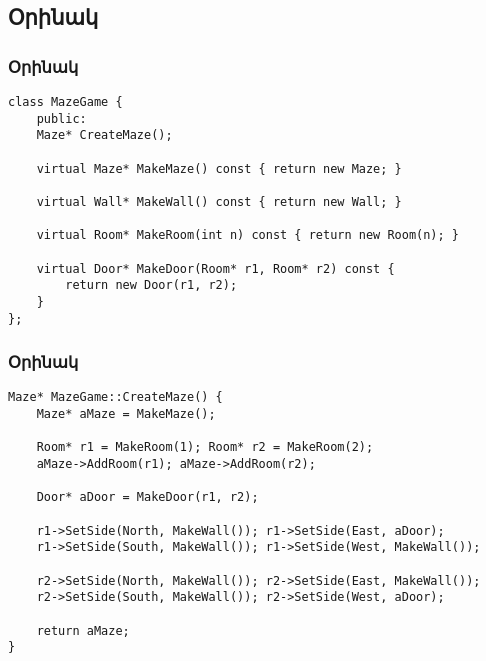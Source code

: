 \documentclass{beamer}
\begin{document}
\subsection{Օրինակ}
\begin{frame}[fragile]\frametitle{Օրինակ}
\begin{english}
\begin{verbatim}
class MazeGame {
    public:
    Maze* CreateMaze();

    virtual Maze* MakeMaze() const { return new Maze; }

    virtual Wall* MakeWall() const { return new Wall; }

    virtual Room* MakeRoom(int n) const { return new Room(n); }

    virtual Door* MakeDoor(Room* r1, Room* r2) const {
        return new Door(r1, r2);
    }
};
\end{verbatim}
\end{english}
\end{frame}

\begin{frame}[fragile]\frametitle{Օրինակ}
\begin{english}
\begin{verbatim}
Maze* MazeGame::CreateMaze() {
    Maze* aMaze = MakeMaze();

    Room* r1 = MakeRoom(1); Room* r2 = MakeRoom(2);
    aMaze->AddRoom(r1); aMaze->AddRoom(r2);

    Door* aDoor = MakeDoor(r1, r2);

    r1->SetSide(North, MakeWall()); r1->SetSide(East, aDoor);
    r1->SetSide(South, MakeWall()); r1->SetSide(West, MakeWall());

    r2->SetSide(North, MakeWall()); r2->SetSide(East, MakeWall());
    r2->SetSide(South, MakeWall()); r2->SetSide(West, aDoor);

    return aMaze;
}
\end{verbatim}
\end{english}
\end{frame}
\end{document}
